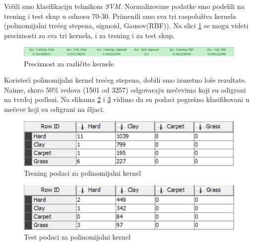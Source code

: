 \documentclass[a4paper]{article}
\begin{document}
Vršili smo klasifikaciju tehnikom \textit{SVM}. Normalizovane podatke smo podelili na trening i test skup u odnosu 70-30.
Primenili smo sva tri raspoloživa kernela (polinomijalni trećeg stepena, sigmoid, Gausov(RBF)).
Na slici \ref{fig:precision} se mogu videti preciznosti za sva tri kernela, i za trening i za test skup.

\begin{figure}[h!]
	\begin{center}
		\includegraphics[scale=0.45]{KNIME_project/SVM/preciznost}
	\end{center}
	\caption{Preciznost za različite kernele}
	\label{fig:precision}
\end{figure}


Koristeći polinomijalni kernel trećeg stepena, dobili smo izuzetno loše rezultate.
Naime, skoro 50\% redova (1501 od 3257) odgovaraju mečevima koji su odigrani na tvrdoj podlozi.
Na slikama \ref{fig:poly_training} i \ref{fig:poly_test} vidimo da su podaci pogrešno klasifikovani u
mečeve koji su odigrani na šljaci.

\begin{figure}[h!]
	\begin{center}
		\includegraphics[scale=0.80]{KNIME_project/SVM/poly_training}
	\end{center}
	\caption{Trening podaci za polinomijalni kernel}
	\label{fig:poly_training}
\end{figure}

\begin{figure}[h!]
	\begin{center}
		\includegraphics[scale=0.80]{KNIME_project/SVM/poly_test}
	\end{center}
	\caption{Test podaci za polinomijalni kernel}
	\label{fig:poly_test}
\end{figure}
\end{document}
